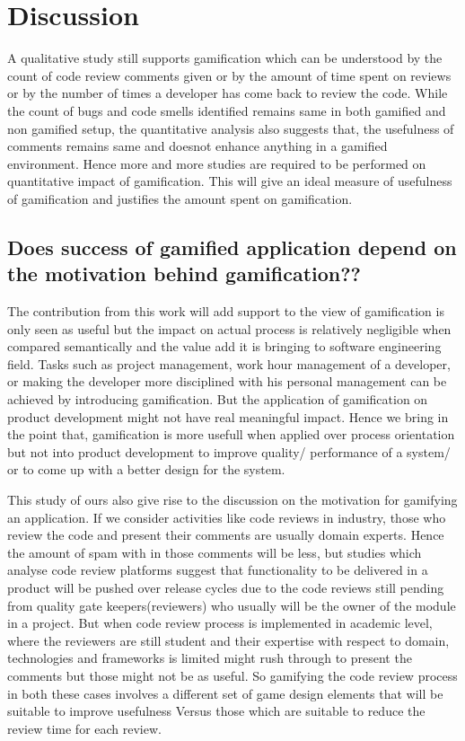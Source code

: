 \documentclass[conference]{IEEEtran}
\begin{document}
\section{Discussion}
A qualitative study still supports gamification which can be understood by the count of code review comments given or by the amount of time spent on reviews or by the number of times a developer has come back to review the code. While the count of bugs and code smells identified remains same in both gamified and non gamified setup, the quantitative analysis also suggests that, the usefulness of comments remains same and doesnot enhance anything in a gamified environment. Hence more and more studies are required to be performed on quantitative impact of gamification. This will give an ideal measure of usefulness of gamification and justifies the amount spent on gamification.

\subsection{Does success of gamified application depend on the motivation behind gamification??}
The contribution from this work will add support to the view of gamification is only seen as useful but the impact on actual process is relatively negligible when compared semantically and the value add it is bringing to software engineering field. Tasks such as project management, work hour management of a developer, or making the developer more disciplined with his personal management can be achieved by introducing gamification. But the application of gamification on product development might not have real meaningful impact. Hence we bring in the point that, gamification is more usefull when applied over process orientation but not into product development to improve quality/ performance of a system/ or to come up with a better design for the system.

This study of ours also give rise to the discussion on the motivation for gamifying an application. If we consider activities like code reviews in industry, those who review the code and present their comments are usually domain experts. Hence the amount of spam with in those comments will be less, but studies which analyse code review platforms \cite{openstack results presented during the semister presentation} suggest that functionality to be delivered in a product will be pushed over release cycles due to the code reviews still pending from quality gate keepers(reviewers) who usually will be the owner of the module in a project. But when code review process is implemented in academic level, where the reviewers are still student and their expertise with respect to domain, technologies and frameworks is limited might rush through to present the comments but those might not be as useful. So gamifying the code review process in both these cases involves a different set of game design elements that will be suitable to improve usefulness Versus those which are suitable to reduce the review time for each review.
\end{document}
